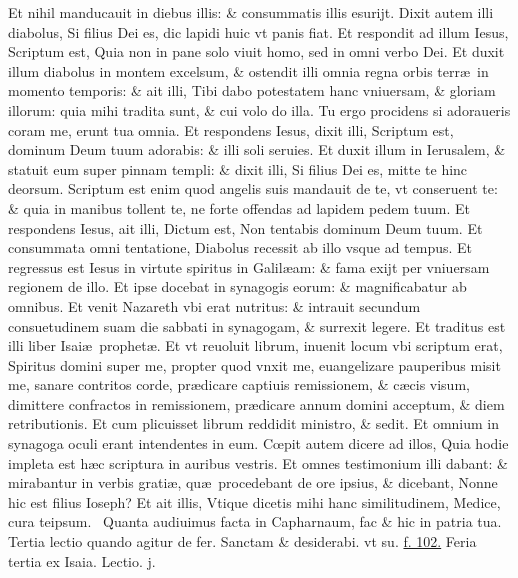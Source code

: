 \documentclass[a5paper,10pt]{book}
\def\leftmarginnote{%
	\lrmarginnote{\hskip -\marginparsep \hskip -6.5em}}
\def\ae{æ}
\def\oe{œ}
\begin{document}
\begin{multicols*}{2}
Et nihil manducauit in diebus illis: \& consummatis illis esurijt.
Dixit autem illi diabolus, Si filius Dei es, dic lapidi huic vt panis fiat.
Et respondit ad illum Iesus, Scriptum est, Quia non in pane solo viuit homo, sed in omni verbo Dei.
Et duxit illum diabolus in montem excelsum, \& ostendit illi omnia regna orbis terr\ae \ in momento temporis: \& ait illi, Tibi dabo potestatem hanc vniuersam, \& gloriam illorum: quia mihi tradita sunt, \& cui volo do illa.
Tu ergo procidens si adoraueris coram me, erunt tua omnia.
Et respondens Iesus, dixit illi, Scriptum est, dominum Deum tuum adorabis: \& illi soli seruies.
Et duxit illum in Ierusalem, \& statuit eum super pinnam templi: \& dixit illi, Si filius Dei es, mitte te hinc deorsum.
Scriptum est enim quod angelis suis mandauit de te, vt conseruent te: \& quia in manibus tollent te, ne forte offendas ad lapidem pedem tuum.
Et respondens Iesus, ait illi, Dictum est, Non tentabis dominum Deum tuum.
Et consummata omni tentatione, Diabolus recessit ab illo vsque ad tempus.
\newline \indent Et regressus est Iesus in virtute spiritus in Galil\ae am: \& fama exijt per vniuersam regionem de illo.
Et ipse docebat in synagogis eorum: \& magnificabatur ab omnibus.
Et venit Nazareth vbi erat nutritus: \& intrauit secundum consuetudinem suam die sabbati in synagogam, \& surrexit legere.
Et traditus est illi liber Isai\ae \ prophet\ae . Et vt reuoluit librum, inuenit locum vbi scriptum erat, Spiritus domini super me, propter quod vnxit me, euangelizare pauperibus misit me, sanare contritos corde, pr\ae dicare captiuis remissionem, \& c\ae cis visum, dimittere confractos in remissionem, pr\ae dicare annum domini acceptum, \& diem retributionis.
Et cum plicuisset librum reddidit ministro, \& sedit. Et omnium in synagoga oculi erant intendentes in eum.
C\oe pit autem dicere ad illos, Quia hodie impleta est h\ae c scriptura in auribus vestris.
Et omnes testimonium illi dabant: \& mirabantur in verbis grati\ae , qu\ae \ procedebant de ore ipsius, \& dicebant, Nonne hic est filius Ioseph?
Et ait illis, Vtique dicetis mihi hanc similitudinem, Medice, cura teipsum.
\textdagger \ Quanta\leftmarginnote{\begin{flushright}B\end{flushright}} audiuimus facta in Capharnaum, fac \& hic in patria tua.
\newline \color{red} Tertia lectio quando agitur de fer. \color{black} Sanctam \& desiderabi. \color{red} vt su. \color{black} \hyperlink{page.102}{f. 102.}
\newline {} \color{red} \hypertarget{TUE-SECUNDA-ADV}{Feria tertia} ex Isaia. \hfill Lectio. j. \color{black}

\end{multicols*}
\end{document}
